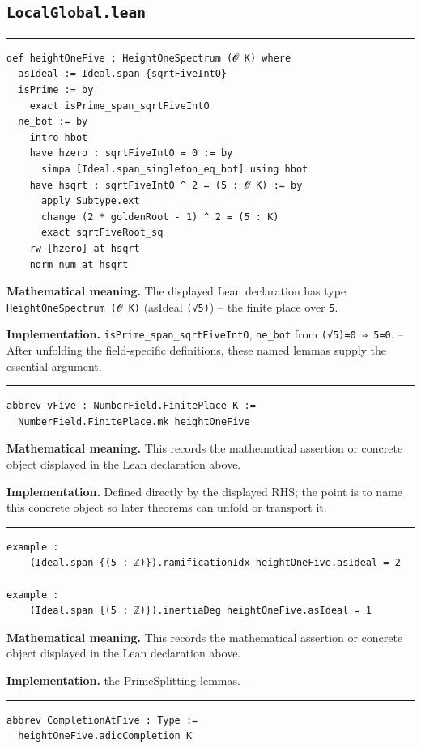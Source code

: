 \documentclass[UTF8,a4paper,11pt,fontset=fandol]{ctexart}
\theoremstyle{definition}
\newcommand{\statementsep}{\par\medskip\hrule\medskip}
\begin{document}
\subsection{\texttt{LocalGlobal.lean}}

\statementsep
\begin{verbatim}
def heightOneFive : HeightOneSpectrum (𝓞 K) where
  asIdeal := Ideal.span {sqrtFiveIntO}
  isPrime := by
    exact isPrime_span_sqrtFiveIntO
  ne_bot := by
    intro hbot
    have hzero : sqrtFiveIntO = 0 := by
      simpa [Ideal.span_singleton_eq_bot] using hbot
    have hsqrt : sqrtFiveIntO ^ 2 = (5 : 𝓞 K) := by
      apply Subtype.ext
      change (2 * goldenRoot - 1) ^ 2 = (5 : K)
      exact sqrtFiveRoot_sq
    rw [hzero] at hsqrt
    norm_num at hsqrt
\end{verbatim}
\noindent\textbf{Mathematical meaning.} The displayed Lean declaration has type \texttt{HeightOneSpectrum (𝓞 K)} (asIdeal \texttt{(√5)}) -- the finite place over \texttt{5}.\par
\noindent\textbf{Implementation.} \texttt{isPrime\_\allowbreak{}span\_\allowbreak{}sqrtFiveIntO}, \texttt{ne\_\allowbreak{}bot} from \texttt{(√5)=0 ⇒ 5=0}. -- After unfolding the field-specific definitions, these named lemmas supply the essential argument.\par
\statementsep
\begin{verbatim}
abbrev vFive : NumberField.FinitePlace K :=
  NumberField.FinitePlace.mk heightOneFive
\end{verbatim}
\noindent\textbf{Mathematical meaning.} This records the mathematical assertion or concrete object displayed in the Lean declaration above.\par
\noindent\textbf{Implementation.} Defined directly by the displayed RHS; the point is to name this concrete object so later theorems can unfold or transport it.\par
\statementsep
\begin{verbatim}
example :
    (Ideal.span {(5 : ℤ)}).ramificationIdx heightOneFive.asIdeal = 2

example :
    (Ideal.span {(5 : ℤ)}).inertiaDeg heightOneFive.asIdeal = 1
\end{verbatim}
\noindent\textbf{Mathematical meaning.} This records the mathematical assertion or concrete object displayed in the Lean declaration above.\par
\noindent\textbf{Implementation.} the PrimeSplitting lemmas. --\par
\statementsep
\begin{verbatim}
abbrev CompletionAtFive : Type :=
  heightOneFive.adicCompletion K
\end{verbatim}
\end{document}
